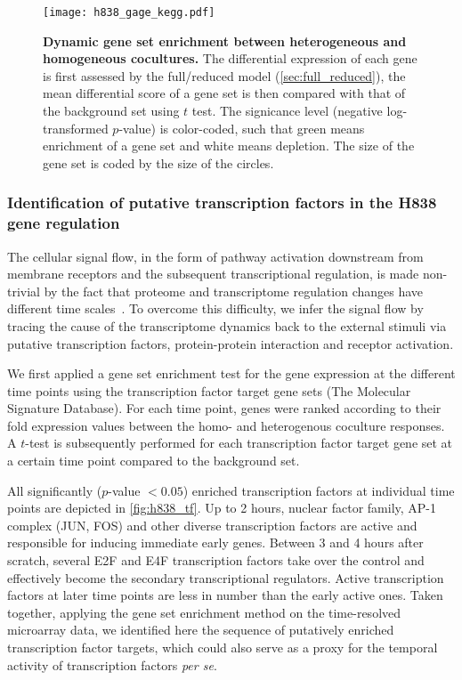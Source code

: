 \begin{figure}[!ht]
\begin{center}
\texttt{[image: h838\_gage\_kegg.pdf]}
\end{center}
\caption[Dynamic gene set enrichment]{
{\bf Dynamic gene set enrichment between heterogeneous and homogeneous 
cocultures.} 
The differential expression of each gene is first assessed by the full/reduced
model (\ref{sec:full_reduced}), the mean differential score of a gene set
is then compared with that of the background set using $t$ test.
The signicance level (negative log-transformed $p$-value) is color-coded, such
that green means enrichment of a gene set and white means depletion. The size
of the gene set is coded by the size of the circles.
}
\label{fig:h838_gage_kegg}
\end{figure}

\subsubsection{Identification of putative transcription factors in the H838 gene regulation}

The cellular signal flow, in the form of pathway activation
downstream from membrane receptors and the subsequent 
transcriptional 
regulation, is made non-trivial by the fact that proteome 
and transcriptome regulation changes have different time scales~\citep{Busch2008}. 
To overcome this difficulty, we infer the signal flow by 
tracing the cause of the transcriptome dynamics back to the external stimuli via putative transcription factors, protein-protein interaction
and receptor activation. 

We first applied a gene set enrichment test for the gene expression at 
the different time points using the transcription factor target gene sets (The Molecular Signature Database).
For each time point, 
genes were ranked according to their fold expression values
between the homo- and heterogenous coculture responses. 
A $t$-test is subsequently performed for each
transcription factor target gene set at a certain time 
point compared to the 
background set.

All significantly ($p$-value $<0.05$) enriched 
transcription factors at individual time points are 
depicted in \ref{fig:h838_tf}. Up to 2 hours, nuclear
factor family, AP-1 complex (JUN, FOS) and other diverse
transcription factors are active and responsible for 
inducing immediate early genes. Between 3 and 4 hours after
scratch, several E2F and E4F transcription factors take
over the control and effectively become the secondary 
transcriptional regulators. Active transcription factors
at later time points are less in number than the early 
active ones.
Taken together, applying the gene set
enrichment method on the time-resolved microarray data, we identified here the
sequence of putatively enriched transcription factor targets, which could also serve as
a proxy for the temporal activity of transcription factors \emph{per se}.

